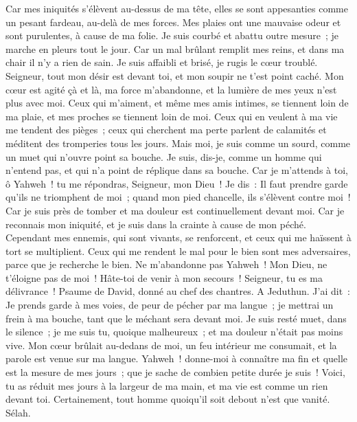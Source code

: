 \begin{multicols}{2}
Car mes iniquités s'élèvent au-dessus de ma tête, elles se sont appesanties comme un pesant fardeau, au-delà de mes forces.
Mes plaies ont une mauvaise odeur et sont purulentes, à cause de ma folie.
Je suis courbé et abattu outre mesure~; je marche en pleurs tout le jour.
Car un mal brûlant remplit mes reins, et dans ma chair il n'y a rien de sain.
Je suis affaibli et brisé, je rugis le cœur troublé.
Seigneur, tout mon désir est devant toi, et mon soupir ne t'est point caché.
Mon cœur est agité çà et là, ma force m'abandonne, et la lumière de mes yeux n'est plus avec moi.
Ceux qui m'aiment, et même mes amis intimes, se tiennent loin de ma plaie, et mes proches se tiennent loin de moi.
Ceux qui en veulent à ma vie me tendent des pièges~; ceux qui cherchent ma perte parlent de calamités et méditent des tromperies tous les jours.
Mais moi, je suis comme un sourd, comme un muet qui n'ouvre point sa bouche.
Je suis, dis-je, comme un homme qui n'entend pas, et qui n'a point de réplique dans sa bouche.
Car je m'attends à toi, ô Yahweh~! tu me répondras, Seigneur, mon Dieu~!
Je dis~: Il faut prendre garde qu'ils ne triomphent de moi~; quand mon pied chancelle, ils s'élèvent contre moi~!
Car je suis près de tomber et ma douleur est continuellement devant moi.
Car je reconnais mon iniquité, et je suis dans la crainte à cause de mon péché.
Cependant mes ennemis, qui sont vivants, se renforcent, et ceux qui me haïssent à tort se multiplient.
Ceux qui me rendent le mal pour le bien sont mes adversaires, parce que je recherche le bien.
Ne m'abandonne pas Yahweh~! Mon Dieu, ne t'éloigne pas de moi~!
Hâte-toi de venir à mon secours~! Seigneur, tu es ma délivrance~!
\VerseOne{}Psaume de David, donné au chef des chantres. A Jeduthun.
J'ai dit~: Je prends garde à mes voies, de peur de pécher par ma langue~; je mettrai un frein à ma bouche, tant que le méchant sera devant moi.
Je suis resté muet, dans le silence~; je me suis tu, quoique malheureux~; et ma douleur n'était pas moins vive.
Mon cœur brûlait au-dedans de moi, un feu intérieur me consumait, et la parole est venue sur ma langue.
Yahweh~! donne-moi à connaître ma fin et quelle est la mesure de mes jours~; que je sache de combien petite durée je suis~!
Voici, tu as réduit mes jours à la largeur de ma main, et ma vie est comme un rien devant toi. Certainement, tout homme quoiqu'il soit debout n'est que vanité. Sélah.

\end{multicols}
